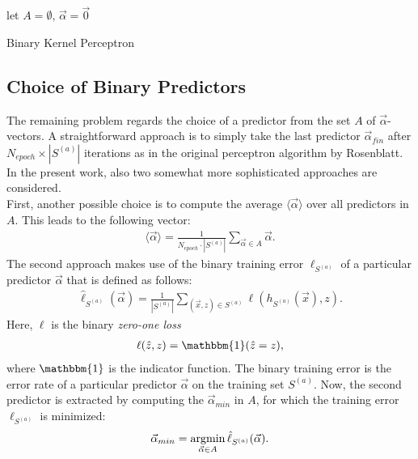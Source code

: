 \begin{algorithm}[H]
\SetAlgoLined
{}
 let $A = \emptyset$, $\vec{\alpha} = \vec{0}$\;
\caption{Binary Kernel Perceptron}
\label{alg:binary_kernel_perceptron}
\end{algorithm}

\subsection{Choice of Binary Predictors}\label{subsec:choice}

The remaining problem regards the choice of a predictor from the set $A$ of $\vec{\alpha}$-vectors. A straightforward approach is to simply take the last predictor $\vec{\alpha}_{fin}$ after $N_{epoch} \times |S^{(a)}|$ iterations as in the original perceptron algorithm by Rosenblatt. In the present work, also two somewhat more sophisticated approaches are considered. \\ 


First, another possible choice is to compute the average $\langle \vec{\alpha} \rangle$ over all predictors in $A$. This leads to the following vector:
\begin{align*}
	\langle \vec{\alpha} \rangle = \frac{1}{N_{epoch} \cdot |S^{(a)}|} 			\sum_{\vec{\alpha} \in A} \vec{\alpha}.
\end{align*}
The second approach makes use of the binary training error $\ell_{S^{(a)}}$ of a particular predictor $\vec{\alpha}$ that is defined as follows:
\begin{align*}
	\hat{\ell}_{S^{(a)}}(\vec{\alpha}) = \frac{1}{|S^{(a)}|} 										\sum_{(\vec{x}, z) \in S^{(a)}} \ell(h_{S^{(a)}}(\vec{x}), z).
\end{align*}
Here, $\ell$ is the binary \textit{zero-one loss}
\begin{align*}
	\ell(\hat{z}, z) = \mathbbm{1}(\hat{z} = z),
\end{align*}
where $\mathbbm{1}$ is the indicator function. The binary training error is the error rate of a particular predictor $\vec{\alpha}$ on the training set $S^{(a)}$. Now, the second predictor is extracted by computing the $\vec{\alpha}_{min}$ in $A$, for which the training error $\ell_{S^{(a)}}$ is minimized:
\begin{align*}
	\vec{\alpha}_{min} = \operatorname*{argmin}_{\vec{\alpha} \in A} \hat{\ell}_{S^{(a)}}(\vec{\alpha}).
\end{align*} 

